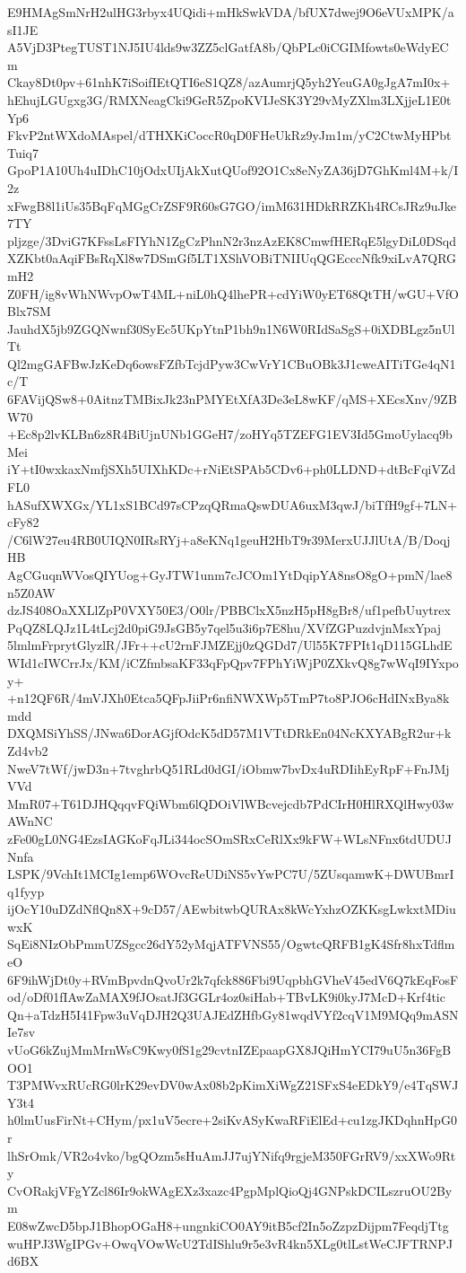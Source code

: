 E9HMAgSmNrH2ulHG3rbyx4UQidi+mHkSwkVDA/bfUX7dwej9O6eVUxMPK/asI1JE
A5VjD3PtegTUST1NJ5IU4lds9w3ZZ5clGatfA8b/QbPLc0iCGIMfowts0eWdyECm
Ckay8Dt0pv+61nhK7iSoifIEtQTI6eS1QZ8/azAumrjQ5yh2YeuGA0gJgA7mI0x+
hEhujLGUgxg3G/RMXNeagCki9GeR5ZpoKVIJeSK3Y29vMyZXlm3LXjjeL1E0tYp6
FkvP2ntWXdoMAspel/dTHXKiCoccR0qD0FHeUkRz9yJm1m/yC2CtwMyHPbtTuiq7
GpoP1A10Uh4uIDhC10jOdxUIjAkXutQUof92O1Cx8eNyZA36jD7GhKml4M+k/I2z
xFwgB8l1iUs35BqFqMGgCrZSF9R60sG7GO/imM631HDkRRZKh4RCsJRz9uJke7TY
pljzge/3DviG7KFssLsFIYhN1ZgCzPhnN2r3nzAzEK8CmwfHERqE5lgyDiL0DSqd
XZKbt0aAqiFBsRqXl8w7DSmGf5LT1XShVOBiTNIIUqQGEcccNfk9xiLvA7QRGmH2
Z0FH/ig8vWhNWvpOwT4ML+niL0hQ4lhePR+cdYiW0yET68QtTH/wGU+VfOBlx7SM
JauhdX5jb9ZGQNwnf30SyEc5UKpYtnP1bh9n1N6W0RIdSaSgS+0iXDBLgz5nUlTt
Ql2mgGAFBwJzKeDq6owsFZfbTcjdPyw3CwVrY1CBuOBk3J1cweAITiTGe4qN1c/T
6FAVijQSw8+0AitnzTMBixJk23nPMYEtXfA3De3eL8wKF/qMS+XEcsXnv/9ZBW70
+Ec8p2lvKLBn6z8R4BiUjnUNb1GGeH7/zoHYq5TZEFG1EV3Id5GmoUylacq9bMei
iY+tI0wxkaxNmfjSXh5UIXhKDc+rNiEtSPAb5CDv6+ph0LLDND+dtBcFqiVZdFL0
hASufXWXGx/YL1xS1BCd97sCPzqQRmaQswDUA6uxM3qwJ/biTfH9gf+7LN+cFy82
/C6lW27eu4RB0UIQN0IRsRYj+a8eKNq1geuH2HbT9r39MerxUJJlUtA/B/DoqjHB
AgCGuqnWVosQIYUog+GyJTW1unm7cJCOm1YtDqipYA8nsO8gO+pmN/lae8n5Z0AW
dzJS408OaXXLlZpP0VXY50E3/O0lr/PBBClxX5nzH5pH8gBr8/uf1pefbUuytrex
PqQZ8LQJz1L4tLcj2d0piG9JsGB5y7qel5u3i6p7E8hu/XVfZGPuzdvjnMsxYpaj
5lmlmFrprytGlyzlR/JFr++cU2rnFJMZEjj0zQGDd7/Ul55K7FPIt1qD115GLhdE
WId1cIWCrrJx/KM/iCZfmbsaKF33qFpQpv7FPhYiWjP0ZXkvQ8g7wWqI9IYxpoy+
+n12QF6R/4mVJXh0Etca5QFpJiiPr6nfiNWXWp5TmP7to8PJO6cHdINxBya8kmdd
DXQMSiYhSS/JNwa6DorAGjfOdcK5dD57M1VTtDRkEn04NcKXYABgR2ur+kZd4vb2
NweV7tWf/jwD3n+7tvghrbQ51RLd0dGI/iObmw7bvDx4uRDIihEyRpF+FnJMjVVd
MmR07+T61DJHQqqvFQiWbm6lQDOiVlWBcvejcdb7PdCIrH0HlRXQlHwy03wAWnNC
zFe00gL0NG4EzsIAGKoFqJLi344ocSOmSRxCeRlXx9kFW+WLsNFnx6tdUDUJNnfa
LSPK/9VchIt1MCIg1emp6WOvcReUDiNS5vYwPC7U/5ZUsqamwK+DWUBmrIq1fyyp
ijOcY10uDZdNflQn8X+9cD57/AEwbitwbQURAx8kWcYxhzOZKKsgLwkxtMDiuwxK
SqEi8NIzObPmmUZSgcc26dY52yMqjATFVNS55/OgwtcQRFB1gK4Sfr8hxTdflmeO
6F9ihWjDt0y+RVmBpvdnQvoUr2k7qfck886Fbi9UqpbhGVheV45edV6Q7kEqFosF
od/oDf01fIAwZaMAX9fJOsatJf3GGLr4oz0siHab+TBvLK9i0kyJ7McD+Krf4tic
Qn+aTdzH5I41Fpw3uVqDJH2Q3UAJEdZHfbGy81wqdVYf2cqV1M9MQq9mASNIe7sv
vUoG6kZujMmMrnWsC9Kwy0fS1g29cvtnIZEpaapGX8JQiHmYCI79uU5n36FgBOO1
T3PMWvxRUcRG0lrK29evDV0wAx08b2pKimXiWgZ21SFxS4eEDkY9/e4TqSWJY3t4
h0lmUusFirNt+CHym/px1uV5ecre+2siKvASyKwaRFiElEd+cu1zgJKDqhnHpG0r
lhSrOmk/VR2o4vko/bgQOzm5sHuAmJJ7ujYNifq9rgjeM350FGrRV9/xxXWo9Rty
CvORakjVFgYZcl86Ir9okWAgEXz3xazc4PgpMplQioQj4GNPskDCILszruOU2Bym
E08wZwcD5bpJ1BhopOGaH8+ungnkiCO0AY9itB5cf2In5oZzpzDijpm7FeqdjTtg
wuHPJ3WgIPGv+OwqVOwWcU2TdIShlu9r5e3vR4kn5XLg0tlLstWeCJFTRNPJd6BX
